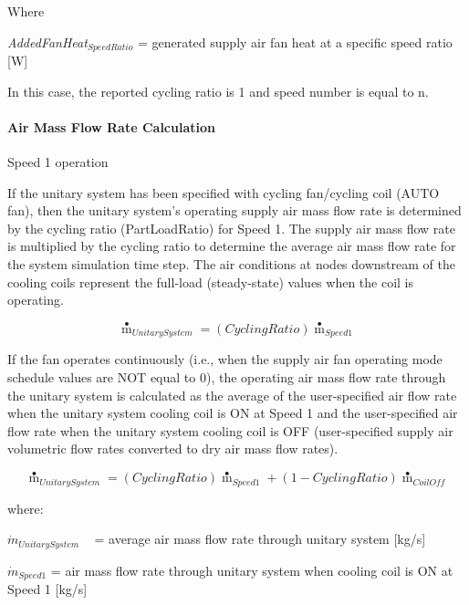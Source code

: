 Where

\emph{AddedFanHeat\(_{SpeedRatio}\)} = generated supply air fan heat at a specific speed ratio {[}W{]}

In this case, the reported cycling ratio is 1 and speed number is equal to n.

\paragraph{Air Mass Flow Rate Calculation}\label{air-mass-flow-rate-calculation}

Speed 1 operation

If the unitary system has been specified with cycling fan/cycling coil (AUTO fan), then the unitary system's operating supply air mass flow rate is determined by the cycling ratio (PartLoadRatio) for Speed 1. The supply air mass flow rate is multiplied by the cycling ratio to determine the average air mass flow rate for the system simulation time step. The air conditions at nodes downstream of the cooling coils represent the full-load (steady-state) values when the coil is operating.

\begin{equation}
{{\mathop m\limits^ \bullet  }_{UnitarySystem}} = \left( {CyclingRatio} \right){{\mathop m\limits^ \bullet  }_{Speed1}}
\end{equation}

If the fan operates continuously (i.e., when the supply air fan operating mode schedule values are NOT equal to 0), the operating air mass flow rate through the unitary system is calculated as the average of the user-specified air flow rate when the unitary system cooling coil is ON at Speed 1 and the user-specified air flow rate when the unitary system cooling coil is OFF (user-specified supply air volumetric flow rates converted to dry air mass flow rates).

\begin{equation}
{{\mathop m\limits^ \bullet  }_{UnitarySystem}} = \left( {CyclingRatio} \right){{\mathop m\limits^ \bullet  }_{Speed1}} + \left( {1 - CyclingRatio} \right){{\mathop m\limits^ \bullet  }_{CoilOff}}
\end{equation}

where:

\({\dot m_{UnitarySystem}}\) ~ = average air mass flow rate through unitary system {[}kg/s{]}

\({\dot m_{Speed1}}\) = air mass flow rate through unitary system when cooling coil is ON at Speed 1 {[}kg/s{]}

